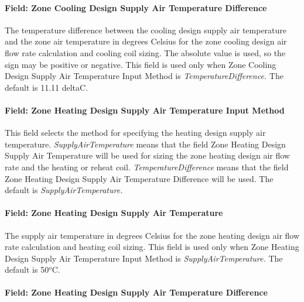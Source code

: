 \paragraph{Field: Zone Cooling Design Supply Air Temperature Difference}\label{field-zone-cooling-design-supply-air-temperature-difference-8}

The temperature difference between the cooling design supply air temperature and the zone air temperature in degrees Celsius for the zone cooling design air flow rate calculation and cooling coil sizing. The absolute value is used, so the sign may be positive or negative. This field is used only when Zone Cooling Design Supply Air Temperature Input Method is \emph{TemperatureDifference.} The default is 11.11 deltaC.

\paragraph{Field: Zone Heating Design Supply Air Temperature Input Method}\label{field-zone-heating-design-supply-air-temperature-input-method-8}

This field selects the method for specifying the heating design supply air temperature. \emph{SupplyAirTemperature} means that the field Zone Heating Design Supply Air Temperature will be used for sizing the zone heating design air flow rate and the heating or reheat coil. \emph{TemperatureDifference} means that the field Zone Heating Design Supply Air Temperature Difference will be used. The default is \emph{SupplyAirTemperature.}

\paragraph{Field: Zone Heating Design Supply Air Temperature}\label{field-zone-heating-design-supply-air-temperature-7}

The supply air temperature in degrees Celsius for the zone heating design air flow rate calculation and heating coil sizing. This field is used only when Zone Heating Design Supply Air Temperature Input Method is \emph{SupplyAirTemperature.} The default is 50\(^{o}\)C.

\paragraph{Field: Zone Heating Design Supply Air Temperature Difference}\label{field-zone-heating-design-supply-air-temperature-difference-8}

